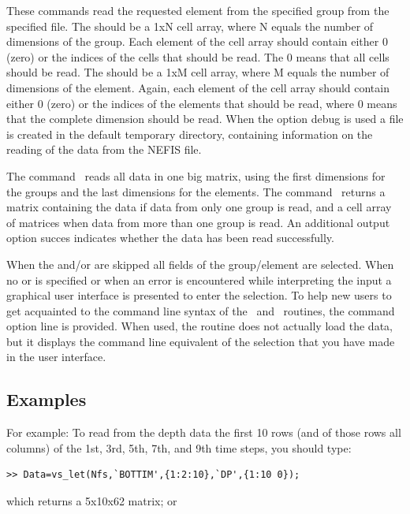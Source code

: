 These commands read the requested element from the specified group from the specified file.
The  should be a 1xN cell array, where N equals the number of dimensions of the group.
Each element of the cell array should contain either 0 (zero) or the indices of the cells that should be read.
The 0 means that all cells should be read.
The  should be a 1xM cell array, where M equals the number of dimensions of the element.
Again, each element of the cell array should contain either 0 (zero) or the indices of the elements that should be read, where 0 means that the complete dimension should be read.
When the option debug is used a file  is created in the default temporary directory, containing information on the reading of the data from the NEFIS file.

The command \vslet~reads all data in one big matrix, using the first dimensions for the groups and the last dimensions for the elements.
The command \vsget~returns a matrix containing the data if data from only one group is read, and a cell array of matrices when data from more than one group is read.
An additional output option succes  indicates whether the data has been read successfully.

When the  and/or  are skipped all fields of the group/element are selected.
When no  or  is specified or when an error is encountered while interpreting the input a graphical user interface is presented to enter the selection.
To help new users to get acquainted to the command line syntax of the \vsget~and \vslet~routines, the command option line  is provided.
When used, the routine does not actually load the data, but it displays the command line equivalent of the selection that you have made in the user interface.

\subsection*{Examples}
 For example: To read from the depth data the first 10 rows (and of those rows all columns) of the 1st, 3rd, 5th, 7th, and 9th time steps, you should type:

\begin{Verbatim}
>> Data=vs_let(Nfs,`BOTTIM',{1:2:10},`DP',{1:10 0});
\end{Verbatim}

which returns a 5x10x62 matrix; or

